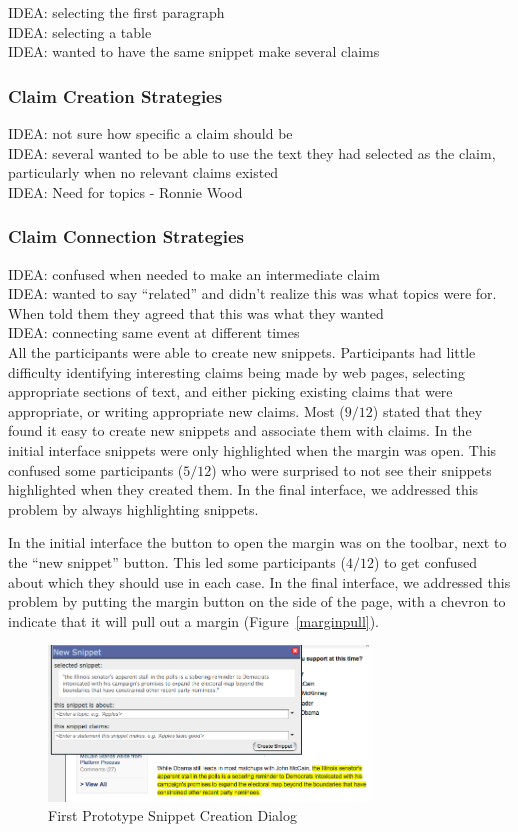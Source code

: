\documentclass{chi2009}
\newcommand{\idea}[1]{{\color{blue} IDEA: #1}\\}
\begin{document}
\idea{selecting the first paragraph}

\idea{selecting a table}

\idea{wanted to have the same snippet make several claims}


\subsubsection{Claim Creation Strategies}

\idea{not sure how specific a claim should be}

\idea{several wanted to be able to use the text they had selected as the claim, particularly when no relevant claims existed}

\idea{Need for topics - Ronnie Wood}

\subsubsection{Claim Connection Strategies}

\idea{confused when needed to make an intermediate claim}
\idea{wanted to say ``related'' and didn't realize this was what topics were for. When told them they agreed that this was what they wanted}
\idea{connecting same event at different times}



All the participants were able to create new snippets. Participants had little difficulty identifying interesting claims being made by web pages, selecting appropriate sections of text, and either picking existing claims that were appropriate, or writing appropriate new claims. Most ($9/12$) stated that they found it easy to create new snippets and associate them with claims.
In the initial interface snippets were only highlighted when the margin was open. This confused some participants ($5/12$) who were surprised to not see their snippets highlighted when they created them. In the final interface, we addressed this problem by always highlighting snippets.

In the initial interface the button to open the margin was on the toolbar, next to the ``new snippet'' button. This led some participants ($4/12$) to get confused about which they should use in each case. In the final interface, we addressed this problem by putting the margin button on the side of the page, with a chevron to indicate that it will pull out a margin (Figure~\ref{marginpull}).

\begin{figure}[ht]
	\includegraphics[width=8.5cm]{../screenshots/snippetdialog_sm.jpg}
	\caption{First Prototype Snippet Creation Dialog}
	\label{oldsnippetbox}
\end{figure}
\end{document}
